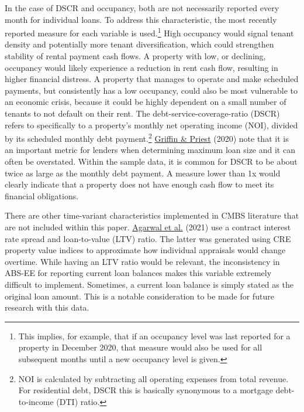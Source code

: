 \documentclass[11pt]{article} %
\begin{document}
In the case of DSCR and occupancy, both are not necessarily reported every month for individual loans. To address this characteristic, the most recently reported measure for each variable is used.\footnote{This implies, for example, that if an occupancy level was last reported for a property in December 2020, that measure would also be used for all subsequent months until a new occupancy level is given.}  High occupancy would signal tenant density and potentially more tenant diversification, which could strengthen stability of rental payment cash flows. A property with low, or declining, occupancy would likely experience a reduction in rent cash flow, resulting in higher financial distress. A property that manages to operate and make scheduled payments, but consistently has a low occupancy, could also be most vulnerable to an economic crisis, because it could be highly dependent on a small number of tenants to not default on their rent. The debt-service-coverage-ratio (DSCR) refers to specifically to a property's monthly net operating income (NOI), divided by its scheduled monthly debt payment.\footnote{NOI is calculated by subtracting all operating expenses from total revenue. For residential debt, DSCR this is basically synonymous to a mortgage debt-to-income (DTI) ratio.} \hyperlink{Griffin}{Griffin \& Priest} (2020) note that it is an important metric for lenders when determining maximum loan size and it can often be overstated. Within the sample data, it is common for DSCR to be about twice as large as the monthly debt payment. A measure lower than 1x would clearly indicate that a property does not have enough cash flow to meet its financial obligations.  

There are other time-variant characteristics implemented in CMBS literature that are not included within this paper.  \hyperlink{Agarwal}{Agarwal et al.} (2021) use a contract interest rate spread and loan-to-value (LTV) ratio. The latter was generated using CRE property value indices to approximate how individual appraisals would change overtime.   While having an LTV ratio would be relevant, the inconsistency in ABS-EE for reporting current loan balances makes this variable extremely difficult to implement. Sometimes, a current loan balance is simply stated as the original loan amount. This is a notable consideration to be made for future research with this data. 
\end{document}
